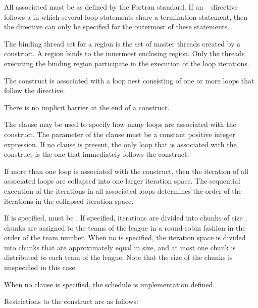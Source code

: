 All associated  must be  as defined by the Fortran standard. If an 
~ directive follows a  in which several loop statements share a  
termination statement, then the directive can only be specified for the outermost of these 
 statements.
\fortranspecificend

\binding
The binding thread set for a  region is the set of master threads created by 
a  construct. A  region binds to the innermost enclosing  
region. Only the threads executing the binding  region participate in the 
execution of the loop iterations.

\descr
The  construct is associated with a loop nest consisting of one or more 
loops that follow the directive.

There is no implicit barrier at the end of a  construct.

The  clause may be used to specify how many loops are associated with the 
 construct. The parameter of the  clause must be a constant 
positive integer expression. If no  clause is present, the only loop that is 
associated with the  construct is the one that immediately follows the 
 construct.

If more than one loop is associated with the  construct, then the iteration 
of all associated loops are collapsed into one larger iteration space. The sequential 
execution of the iterations in all associated loops determines the order of the iterations in 
the collapsed iteration space.

If  is specified,  must be . If specified, iterations are 
divided into chunks of size , chunks are assigned to the teams of the league in 
a round-robin fashion in the order of the team number. When no  is specified, 
the iteration space is divided into chunks that are approximately equal in size, and at 
most one chunk is distributed to each team of the league. Note that the size of the 
chunks is unspecified in this case.

When no  clause is specified, the schedule is implementation defined.

\restrictions
Restrictions to the  construct are as follows:

